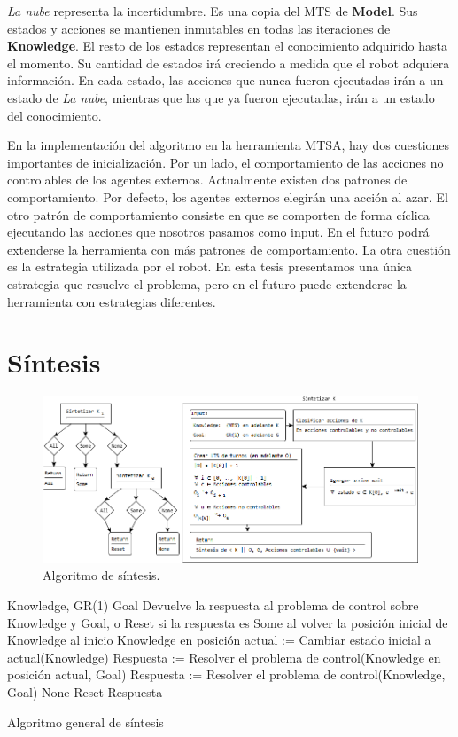 \textit{La nube} representa la incertidumbre. Es una copia del MTS de \textbf{Model}. Sus estados y acciones se mantienen inmutables en todas las 
iteraciones de \textbf{Knowledge}. 
El resto de los estados representan el conocimiento adquirido hasta el momento. Su cantidad de estados irá creciendo a medida que el robot adquiera información. 
En cada estado, las acciones que nunca fueron ejecutadas irán a un estado de 
\textit{La nube}, mientras que las que ya fueron ejecutadas, irán a un estado 
del conocimiento.


En la implementación del algoritmo en la herramienta MTSA, hay dos cuestiones importantes de inicialización. 
Por un lado, el comportamiento de las acciones no controlables de los agentes externos. Actualmente existen dos patrones de comportamiento. 
Por defecto, los agentes externos elegirán una acción al azar. El otro patrón de comportamiento consiste en que se comporten de forma cíclica ejecutando 
las acciones que nosotros pasamos como input. En el futuro podrá extenderse la herramienta con más patrones de comportamiento. 
La otra cuestión es la estrategia utilizada por el robot. En esta tesis presentamos una única estrategia que resuelve el problema, pero en el futuro puede 
extenderse la herramienta con estrategias diferentes.

\section{Síntesis}

\begin{figure}[H]
  \centering
    \includegraphics[width=1.0\textwidth]{Imagenes/Algoritmo/Algoritmo_sintetizar.png}
  \caption{Algoritmo de síntesis.}
  \label{fig:Algoritmo_sintetizar}
\end{figure}

\begin{algorithm}
\begin{algorithmic}
 Knowledge, GR(1) Goal
\ENSURE Devuelve la respuesta al problema de control sobre Knowledge y Goal, o Reset si la respuesta es Some al volver la posición inicial de Knowledge al inicio
\STATE Knowledge en posición actual := Cambiar estado inicial a actual(Knowledge)
\STATE Respuesta := Resolver el problema de control(Knowledge en posición actual, Goal)
\STATE Respuesta := Resolver el problema de control(Knowledge, Goal)
\RETURN None
\ELSE
\RETURN Reset
\ENDIF
\ELSE
\RETURN Respuesta
\ENDIF
\end{algorithmic}
\caption{Algoritmo general de síntesis}
\end{algorithm}

